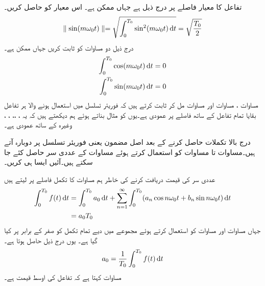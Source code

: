 تفاعل  کا معیار  فاصلے پر درج ذیل ہے جہاں  ممکن ہے۔ اس معیار کو حاصل کریں۔
\begin{align}\label{مساوات_فوریئر_مختلف_تکمل_ٹ}
\parallel \sin (m\omega_0 t) \parallel =\sqrt{\int_0^{T_0} \sin^2 (m\omega_0 t) \dif t}=\sqrt{\frac{T_0}{2}}
\end{align}
درج ذیل دو مساوات کو ثابت کریں جہاں  ممکن ہے۔
\begin{align}
\int_0^{T_0} \cos (m\omega_0 t) \dif t&=0 \label{مساوات_فوریئر_مختلف_تکمل_ث}\\
\int_0^{T_0} \sin (m\omega_0 t) \dif t&=0\label{مساوات_فوریئر_مختلف_تکمل_ج}
\end{align}
مساوات ، مساوات  اور مساوات  مل کر ثابت کرتے ہیں کہ فوریئر تسلسل میں استعمال ہونے والا ہر تفاعل بقایا تمام تفاعل کے ساتھ  فاصلے پر عمودی ہے۔یوں  کو مثال بناتے ہوئے ہم دیکھتے ہیں کہ یہ ، ،، ، ،  وغیرہ کے ساتھ عمودی ہے۔

درج بالا تکملات حاصل کرنے کے بعد اصل مضمون یعنی فوریئر تسلسل پر دوبارہ آتے ہیں۔مساوات  تا مساوات  کو استعمال کرتے ہوئے مساوات   کے عددی سر  حاصل کئے جا سکتے ہیں۔آئیں ایسا ہی کریں۔

عددی سر  کی قیمت دریافت کرنے کی خاطر ہم  مساوات   کا تکمل  فاصلے پر لیتے ہیں
\begin{align*}
\int_0^{T_0}f(t) \dif t&=\int_0^{T_0} a_0 \dif t+\sum_{n=1}^{\infty}  \int_0^{T_0}(a_n\cos n \omega_0 t +b_n \sin n \omega_0 t) \dif t\\
&=a_0 T_0
\end{align*}
جہاں مساوات  اور مساوات  کو استعمال کرتے ہوئے مجموعے میں دیے تمام تکمل کو صفر کے برابر پر کیا گیا ہے۔ یوں درج ذیل حاصل ہوتا ہے۔
\begin{align}\label{مساوات_فوریئر_عددی_سر_الف}
a_0=\frac{1}{T_0}\int_0^{T_0}f(t) \dif t
\end{align}
مساوات  کہتا ہے کہ  تفاعل  کی اوسط قیمت ہے۔


